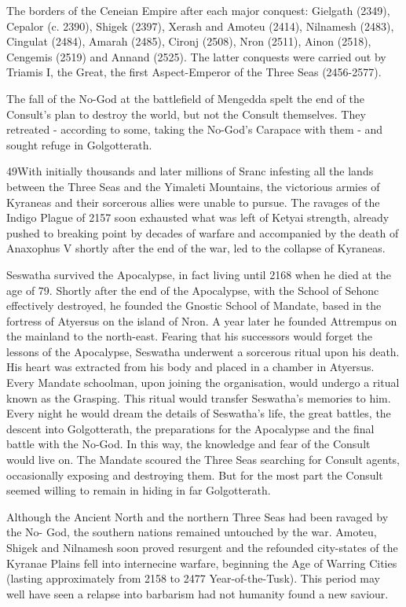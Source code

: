 \documentclass[]{book}
\begin{document}
The borders of the Ceneian Empire after each major conquest: Gielgath (2349), Cepalor (c. 2390),
Shigek (2397), Xerash and Amoteu (2414), Nilnamesh (2483), Cingulat (2484), Amarah (2485), Cironj
(2508), Nron (2511), Ainon (2518), Cengemis (2519) and Annand (2525). The latter conquests were
carried out by Triamis I, the Great, the first Aspect-Emperor of the Three Seas (2456-2577).

The fall of the No-God at the battlefield of Mengedda spelt the end of the Consult's
plan to destroy the world, but not the Consult themselves. They retreated - according to
some, taking the No-God's Carapace with them - and sought refuge in Golgotterath.

49With initially thousands and later millions of Sranc infesting all the lands between the
Three Seas and the Yimaleti Mountains, the victorious armies of Kyraneas and their
sorcerous allies were unable to pursue. The ravages of the Indigo Plague of 2157 soon
exhausted what was left of Ketyai strength, already pushed to breaking point by decades
of warfare and accompanied by the death of Anaxophus V shortly after the end of the
war, led to the collapse of Kyraneas.

Seswatha survived the Apocalypse, in fact living until 2168 when he died at the age of
79. Shortly after the end of the Apocalypse, with the School of Sehonc effectively
destroyed, he founded the Gnostic School of Mandate, based in the fortress of Atyersus
on the island of Nron. A year later he founded Attrempus on the mainland to the
north-east. Fearing that his successors would forget the lessons of the Apocalypse,
Seswatha underwent a sorcerous ritual upon his death. His heart was extracted from his
body and placed in a chamber in Atyersus. Every Mandate schoolman, upon joining the
organisation, would undergo a ritual known as the Grasping. This ritual would transfer
Seswatha's memories to him. Every night he would dream the details of Seswatha's life,
the great battles, the descent into Golgotterath, the preparations for the Apocalypse
and the final battle with the No-God. In this way, the knowledge and fear of the
Consult would live on. The Mandate scoured the Three Seas searching for Consult
agents, occasionally exposing and destroying them. But for the most part the Consult
seemed willing to remain in hiding in far Golgotterath.

Although the Ancient North and the northern Three Seas had been ravaged by the No-
God, the southern nations remained untouched by the war. Amoteu, Shigek and
Nilnamesh soon proved resurgent and the refounded city-states of the Kyranae Plains
fell into internecine warfare, beginning the Age of Warring Cities (lasting
approximately from 2158 to 2477 Year-of-the-Tusk). This period may well have seen a
relapse into barbarism had not humanity found a new saviour.
\end{document}
